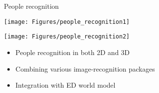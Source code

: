 \documentclass[12pt,a4paper]{article}
\newcommand{\emptylogo}{\texttt{[image: Figures/Empty]}}
\begin{document}
\begin{slidetop}
\begin{multicols}{2}
\vspace{-0.4cm} %

\begin{bclogo}[couleur = white, arrondi = 0.25, couleurBord = tuedarkblue , barre = none, logo=\emptylogo]{\textcolor{tuedarkblue}{People recognition}}
\medskip %
\begin{minipage}[T]{0.48\linewidth}
	\begin{center}
		\texttt{[image: Figures/people\_recognition1]}
	\end{center}
\end{minipage}
\hfill
\begin{minipage}[T]{0.48\linewidth}
    \begin{center}
        \texttt{[image: Figures/people\_recognition2]}
    \end{center}
\end{minipage}
\begin{itemize}[topsep=0pt, itemsep = 0pt, parsep = 0pt, leftmargin=15pt]
	\item People recognition in both 2D and 3D
	\item Combining various image-recognition packages
    \item Integration with ED world model
\end{itemize}
\end{bclogo}

\vspace{-0.4cm} %


\end{multicols}
\end{slidetop}
\end{document}
